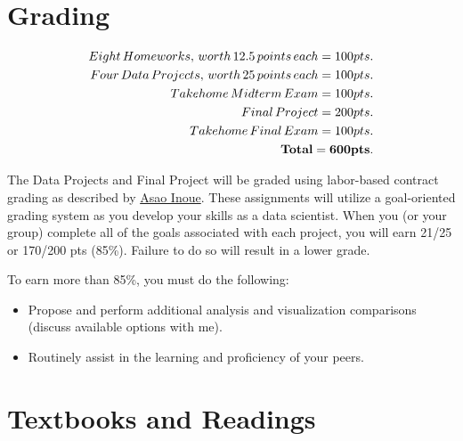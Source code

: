 \documentclass[11pt]{article} %
\begin{document}
\section{Grading}

  \begin{align*}
    Eight \, Homeworks, \, worth \, 12.5 \, points \, each = 100 pts.\\
    Four \, Data \, Projects, \, worth \, 25 \, points \, each = 100 pts.\\
    Takehome \, Midterm \, Exam = 100 pts.\\
    Final \, Project = 200 pts.\\
    Takehome \, Final \, Exam = 100 pts.\\
    {\bf Total = 600 pts.}
  \end{align*}

  The Data Projects and Final Project will be graded using labor-based contract grading as described by \href{http://www.translingualwriting.com/resources/Inoue\%20Contract.pdf}{Asao Inoue}. These assignments will utilize a goal-oriented grading system as you develop your skills as a data scientist.  When you (or your group) complete all of the goals associated with each project, you will earn 21/25 or 170/200 pts (85\%). Failure to do so will result in a lower grade.

To earn more than 85\%, you must do the following:
\begin{itemize}
  \item Propose and perform additional analysis and visualization comparisons (discuss available options with me).
  \item Routinely assist in the learning and proficiency of your peers.
\end{itemize}


\section{Textbooks and Readings}
\end{document}
